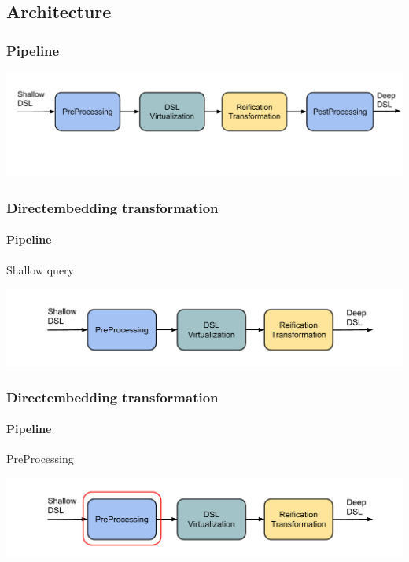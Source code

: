 \documentclass[xcolor=dvipsnames]{beamer}
\theoremstyle{definition}
\begin{document}
\subsection{Architecture} %
\label{sub:Architecture}

\begin{frame}[fragile]
    \frametitle{Pipeline}
    \begin{center}
        \includegraphics[width=\textwidth]{img/Architecture.pdf}
    \end{center}
\end{frame}

\begin{frame}[fragile]
    \frametitle{Directembedding transformation}
    \framesubtitle{Pipeline}
    \begin{block}{Shallow query}
        
    \end{block}
    \begin{center}
        \includegraphics[width=\textwidth]{img/pipeline1.pdf}
    \end{center}
\end{frame}

\begin{frame}[fragile]
    \frametitle{Directembedding transformation}
    \framesubtitle{Pipeline}
    \begin{block}{PreProcessing}
        
    \end{block}
    \begin{center}
        \includegraphics[width=\textwidth]{img/pipeline2.pdf}
    \end{center}
\end{frame}
\end{document}

